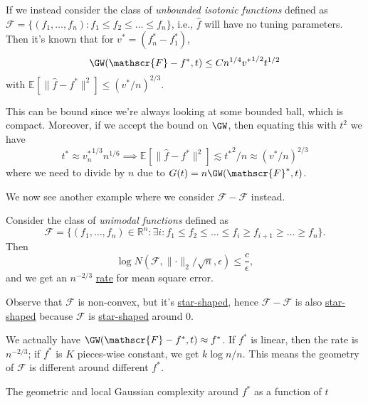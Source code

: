 \begin{eg}
	If we instead consider the class of \emph{unbounded isotonic functions} defined as \(\mathscr{F} = \{(f_1, \dots , f_n) \colon f_1 \leq f_2 \leq \dots \leq f_n \}\), i.e., \(\hat{f} \) will have no tuning parameters. Then it's known that for \(v^{\ast} = (f^{\ast} _n - f^{\ast} _1)\),
	\[
		\GW(\mathscr{F} - f^{\ast} , t) \leq C n^{1 / 4} {v^{\ast} }^{1 / 2} t^{1 / 2}
	\]
	with \(\mathbb{E}_{}[\lVert \hat{f} - f^{\ast}  \rVert ^2 ] \leq (v^{\ast} / n)^{2 / 3}\).
\end{eg}
\begin{explanation}
	This can be bound since we're always looking at some bounded ball, which is compact. Moreover, if we accept the bound on \(\GW\), then equating this with \(t^2\) we have
	\[
		t^{\ast} \approx {v^{\ast} _n}^{1 / 3} n^{1 / 6}
		\implies \mathbb{E}_{}\left[\lVert \hat{f} - f^{\ast} \rVert ^2 \right] \lesssim {t^{\ast} }^2 / n \approx (v^{\ast} / n)^{2 / 3}
	\]
	where we need to divide by \(n\) due to \(G(t) = n \GW(\mathscr{F} ^{\ast} , t)\).
\end{explanation}

We now see another example where we consider \(\mathscr{F} - \mathscr{F} \) instead.

\begin{eg}
	Consider the class of \emph{unimodal functions} defined as
	\[
		\mathscr{F} = \{ (f_1, \dots , f_n) \in \mathbb{R} ^n \colon \exists i \colon f_1 \leq f_2 \leq \dots \leq f_i \geq f_{i+1} \geq \dots \geq f_n \}.
	\]
	Then
	\[
		\log N(\mathscr{F} , \lVert \cdot \rVert _2 / \sqrt{n} , \epsilon ) \leq \frac{c}{\epsilon },
	\]
	and we get an \(n^{-2 / 3}\) \hyperref[def:rate-of-convergence]{rate} for mean square error.
\end{eg}
\begin{explanation}
	Observe that \(\mathscr{F} \) is non-convex, but it's \hyperref[def:star-shaped]{star-shaped}, hence \(\mathscr{F} - \mathscr{F} \) is also \hyperref[def:star-shaped]{star-shaped} because \(\mathscr{F} \) is \hyperref[def:star-shaped]{star-shaped} around \(0\).
\end{explanation}

\begin{remark}
	We actually have \(\GW(\mathscr{F} - f^{\ast} , t) \approx f^{\ast} \). If \(f^{\ast} \) is linear, then the rate is \(n^{-2 / 3}\); if \(f^{\ast} \) is \(K\) pieces-wise constant, we get \(k \log n / n\). This means the geometry of \(\mathscr{F} \) is different around different \(f^{\ast} \).
\end{remark}

The geometric and local Gaussian complexity around \(f^{\ast} \) as a function of \(t\)